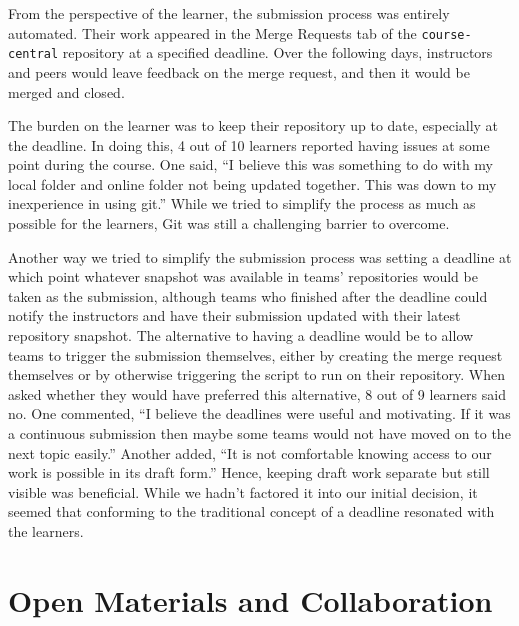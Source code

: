 \documentclass[12pt,twoside]{mitthesis}
\newcommand{\review}[1]{{\color{mygreen} #1}}
\begin{document}
\review{From the perspective of the learner, the submission process was entirely automated. Their work appeared in the Merge Requests tab of the \texttt{course-central} repository at a specified deadline. Over the following days, instructors and peers would leave feedback on the merge request, and then it would be merged and closed.

The burden on the learner was to keep their repository up to date, especially at the deadline. In doing this, 4 out of 10 learners reported having issues at some point during the course. One said, ``I believe this was something to do with my local folder and online folder not being updated together. This was down to my inexperience in using git.'' While we tried to simplify the process as much as possible for the learners, Git was still a challenging barrier to overcome.

Another way we tried to simplify the submission process was setting a deadline at which point whatever snapshot was available in teams' repositories would be taken as the submission, although teams who finished after the deadline could notify the instructors and have their submission updated with their latest repository snapshot. The alternative to having a deadline would be to allow teams to trigger the submission themselves, either by creating the merge request themselves or by otherwise triggering the script to run on their repository. When asked whether they would have preferred this alternative, 8 out of 9 learners said no. One commented, ``I believe the deadlines were useful and motivating. If it was a continuous submission then maybe some teams would not have moved on to the next topic easily.'' Another added, ``It is not comfortable knowing access to our work is possible in its draft form.'' Hence, keeping draft work separate but still visible was beneficial. While we hadn't factored it into our initial decision, it seemed that conforming to the traditional concept of a deadline resonated with the learners.}

\section{Open Materials and Collaboration}
\end{document}
